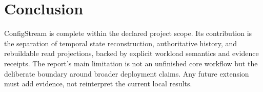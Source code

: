 \documentclass[a4paper,11pt]{article}
\begin{document}
\section{Conclusion}

ConfigStream is complete within the declared project scope. Its contribution is the separation of temporal state reconstruction, authoritative history, and rebuildable read projections, backed by explicit workload semantics and evidence receipts. The report's main limitation is not an unfinished core workflow but the deliberate boundary around broader deployment claims. Any future extension must add evidence, not reinterpret the current local results.

\nocite{*}


\end{document}
